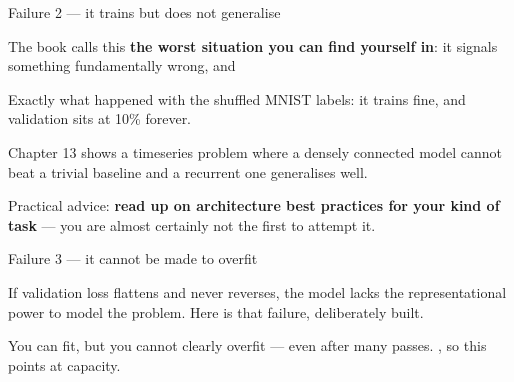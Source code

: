 \documentclass[aspectratio=169,11pt,t]{beamer}
\begin{document}
\begin{frame}[shrink=25]{Failure 2 --- it trains but does not generalise}
\begin{iband}[rose]
The book calls this \textbf{the worst situation you can find yourself in}: it signals something fundamentally wrong, and 
\end{iband}
\begin{minipage}[t]{0.494\textwidth}
\begin{icardbad}
Exactly what happened with the shuffled MNIST labels: it trains fine, and validation sits at 10\% forever.
\end{icardbad}
\end{minipage}%
\hfill
\begin{minipage}[t]{0.494\textwidth}
\begin{icardwarn}
Chapter 13 shows a timeseries problem where a densely connected model cannot beat a trivial baseline and a recurrent one generalises well.
\end{icardwarn}
\end{minipage}%
{\fontsize{9.4}{12.6}\selectfont\color{fg2}Practical advice: \textbf{read up on architecture best practices for your kind of task} --- you are almost certainly not the first to attempt it.\par}\vskip 4pt
\end{frame}

\begin{frame}[shrink=25]{Failure 3 --- it cannot be made to overfit}
{\fontsize{9.4}{12.6}\selectfont\color{fg2}If validation loss flattens and never reverses, the model lacks the representational power to model the problem. Here is that failure, deliberately built.\par}\vskip 4pt
\begin{iband}[signal]
You can fit, but you cannot clearly overfit --- even after many passes. , so this points at capacity.
\end{iband}
\end{frame}
\end{document}
